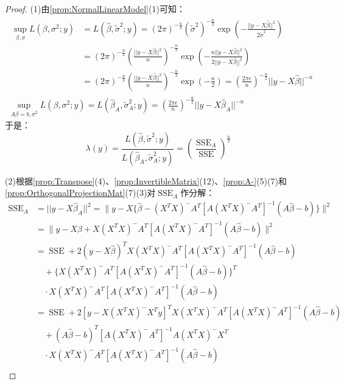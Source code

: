 \begin{proof}
	(1)由\cref{prop:NormalLinearModel}(1)可知：
	\begin{gather*}
		\begin{aligned}
			\sup_{\beta,\sigma}L(\beta,\sigma^2;y)&=L(\hat{\beta},\tilde{\sigma}^2;y)=(2\pi)^{-\frac{n}{2}}(\tilde{\sigma}^2)^{-\frac{n}{2}}\exp\left(-\frac{||y-X\hat{\beta}||^2}{2\tilde{\sigma}^2}\right) \\
			&=(2\pi)^{-\frac{n}{2}}\left(\frac{||y-X\hat{\beta}||^2}{n}\right)^{-\frac{n}{2}}\exp\left(-\frac{n||y-X\hat{\beta}||^2}{2||y-X\hat{\beta}||^2}\right) \\
			&=(2\pi)^{-\frac{n}{2}}\left(\frac{||y-X\hat{\beta}||^2}{n}\right)^{-\frac{n}{2}}\exp\left(-\frac{n}{2}\right)=\left(\frac{2\pi e}{n}\right)^{-\frac{n}{2}}||y-X\hat{\beta}||^{-n}
		\end{aligned} \\
		\sup_{A\beta=b,\sigma^2}L(\beta,\sigma^2;y)=L(\hat{\beta}_A,\tilde{\sigma}_A^2;y)=\left(\frac{2\pi e}{n}\right)^{-\frac{n}{2}}||y-X\hat{\beta}_A||^{-n}
	\end{gather*}
	于是：
	\begin{equation*}
		\lambda(y)=\frac{L(\hat{\beta},\tilde{\sigma}^2;y)}{L(\hat{\beta}_A,\tilde{\sigma}_A^2;y)}=\left(\frac{\operatorname{SSE}_A}{\operatorname{SSE}}\right)^\frac{n}{2}
	\end{equation*}\par
	(2)根据\cref{prop:Transpose}(4)、\cref{prop:InvertibleMatrix}(12)、\cref{prop:A-}(5)(7)和\cref{prop:OrthogonalProjectionMat}(7)(3)对$\operatorname{SSE}_A$作分解：
	\begin{align*}
		\operatorname{SSE}_A&=||y-X\hat{\beta}_A||^2=\Big\|y-X\{\hat{\beta}-(X^TX)^-A^T[A(X^TX)^-A^T]^{-1}(A\hat{\beta}-b)\}\Big\|^2 \\
		&=\Big\|y-X\hat{\beta}+X(X^TX)^-A^T[A(X^TX)^-A^T]^{-1}(A\hat{\beta}-b)\Big\|^2 \\
		&=\operatorname{SSE}+2(y-X\hat{\beta})^TX(X^TX)^-A^T[A(X^TX)^-A^T]^{-1}(A\hat{\beta}-b) \\
		&\quad+\{X(X^TX)^-A^T[A(X^TX)^-A^T]^{-1}(A\hat{\beta}-b)\}^T \\
		&\quad\cdot X(X^TX)^-A^T[A(X^TX)^-A^T]^{-1}(A\hat{\beta}-b) \\
		&=\operatorname{SSE}+2[y-X(X^TX)^-X^Ty]^TX(X^TX)^-A^T[A(X^TX)^-A^T]^{-1}(A\hat{\beta}-b) \\
		&\quad+(A\hat{\beta}-b)^T[A(X^TX)^-A^T]^{-1}A(X^TX)^-X^T \\
		&\quad\cdot X(X^TX)^-A^T[A(X^TX)^-A^T]^{-1}(A\hat{\beta}-b) \\

\end{align*}
\end{proof}

